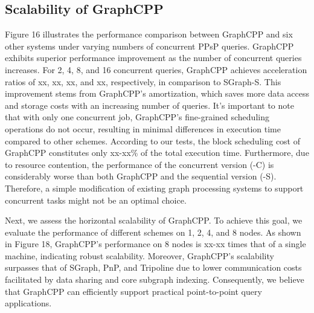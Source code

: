 \documentclass[lettersize,journal]{IEEEtran} %
\begin{document}
\subsection{Scalability of GraphCPP}
Figure 16 illustrates the performance comparison between GraphCPP and six other systems under varying numbers of concurrent PPsP queries. GraphCPP exhibits superior performance improvement as the number of concurrent queries increases. For 2, 4, 8, and 16 concurrent queries, GraphCPP achieves acceleration ratios of xx, xx, xx, and xx, respectively, in comparison to SGraph-S. This improvement stems from GraphCPP's amortization, which saves more data access and storage costs with an increasing number of queries. It's important to note that with only one concurrent job, GraphCPP's fine-grained scheduling operations do not occur, resulting in minimal differences in execution time compared to other schemes. According to our tests, the block scheduling cost of GraphCPP constitutes only xx-xx\% of the total execution time. Furthermore, due to resource contention, the performance of the concurrent version (-C) is considerably worse than both GraphCPP and the sequential version (-S). Therefore, a simple modification of existing graph processing systems to support concurrent tasks might not be an optimal choice.

Next, we assess the horizontal scalability of GraphCPP. To achieve this goal, we evaluate the performance of different schemes on 1, 2, 4, and 8 nodes. As shown in Figure 18, GraphCPP's performance on 8 nodes is xx-xx times that of a single machine, indicating robust scalability. Moreover, GraphCPP's scalability surpasses that of SGraph\cite{sgraph}, PnP\cite{pnp}, and Tripoline\cite{tripoline} due to lower communication costs facilitated by data sharing and core subgraph indexing. Consequently, we believe that GraphCPP can efficiently support practical point-to-point query applications.
\end{document}
